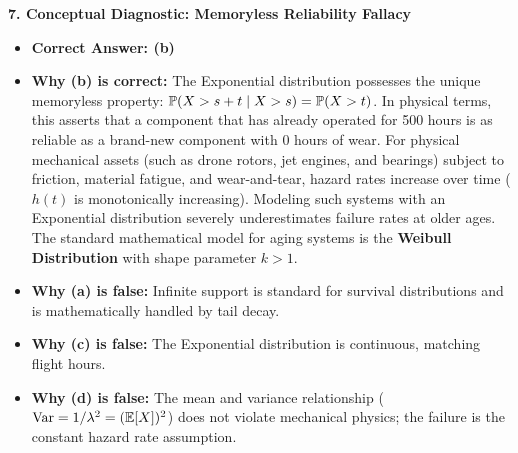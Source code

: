 \textbf{7. Conceptual Diagnostic: Memoryless Reliability Fallacy}
\begin{itemize}
    \item \textbf{Correct Answer: (b)}
    \item \textbf{Why (b) is correct:} The Exponential distribution possesses the unique memoryless property: $\P(X > s + t \mid X > s) = \P(X > t)$. In physical terms, this asserts that a component that has already operated for 500 hours is as reliable as a brand-new component with 0 hours of wear. For physical mechanical assets (such as drone rotors, jet engines, and bearings) subject to friction, material fatigue, and wear-and-tear, hazard rates increase over time ($h(t)$ is monotonically increasing). Modeling such systems with an Exponential distribution severely underestimates failure rates at older ages. The standard mathematical model for aging systems is the \textbf{Weibull Distribution} with shape parameter $k > 1$.
    \item \textbf{Why (a) is false:} Infinite support is standard for survival distributions and is mathematically handled by tail decay.
    \item \textbf{Why (c) is false:} The Exponential distribution is continuous, matching flight hours.
    \item \textbf{Why (d) is false:} The mean and variance relationship ($\Var = 1/\lambda^2 = (\E[X])^2$) does not violate mechanical physics; the failure is the constant hazard rate assumption.
\end{itemize}